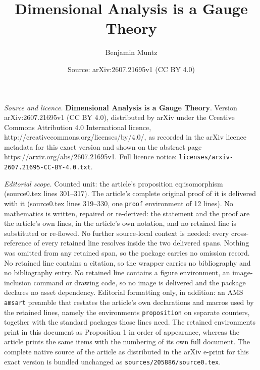 \documentclass[10pt,a4paper]{amsart}
\title{\Large\textbf{Dimensional Analysis is a Gauge Theory}}
\author{Benjamin Muntz}
\date{Source: arXiv:2607.21695v1 (CC BY 4.0)}
\begin{document}
\maketitle

\noindent\emph{Source and licence.} \Large\textbf{Dimensional Analysis is a Gauge Theory}. Version arXiv:2607.21695v1 (CC BY 4.0), distributed by arXiv under the Creative Commons Attribution 4.0 International licence, http://creativecommons.org/licenses/by/4.0/, as recorded in the arXiv licence metadata for this exact version and shown on the abstract page https://arxiv.org/abs/2607.21695v1. Full licence notice: \texttt{licenses/arxiv-2607.21695-CC-BY-4.0.txt}.\par\smallskip

\noindent\textit{Editorial scope.} Counted unit: the article's proposition eq:isomorphism (source0.tex lines 301--317). The article's complete original proof of it is delivered with it (source0.tex lines 319--330, one \texttt{proof} environment of 12 lines). No mathematics is written, repaired or re-derived: the statement and the proof are the article's own lines, in the article's own notation, and no retained line is substituted or re-flowed.  No further source-local context is needed: every cross-reference of every retained line resolves inside the two delivered spans.  Nothing was omitted from any retained span, so the package carries no omission record.  No retained line contains a citation, so the wrapper carries no bibliography and no bibliography entry.  No retained line contains a figure environment, an image-inclusion command or drawing code, so no image is delivered and the package declares no asset dependency.  Editorial formatting only, in addition: an AMS \texttt{amsart} preamble that restates the article's own declarations and macros used by the retained lines, namely the environments \texttt{proposition} on separate counters, together with the standard packages those lines need.  The retained environments print in this document as Proposition 1 in order of appearance, whereas the article prints the same items with the numbering of its own full document.  The complete native source of the article as distributed in the arXiv e-print for this exact version is bundled unchanged as \texttt{sources/205886/source0.tex}.
\end{document}
